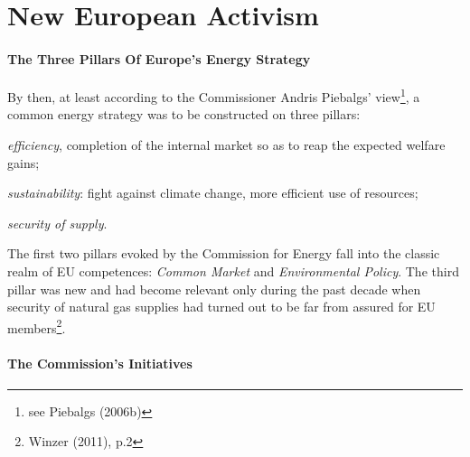 \documentclass[11pt,a4paper,english]{scrreprt}
\begin{document}
  \section{New European Activism}


	\paragraph{The Three Pillars Of Europe's Energy Strategy}

By then, at least according to the Commissioner Andris Piebalgs'
view\footnote{see Piebalgs (2006b)}, a common energy strategy was to be
constructed on three pillars: 
  \begin{inparaenum}[(1)] \item \emph{efficiency}, completion of the internal
market so as to reap the expected welfare gains; \item \emph{sustainability}:
fight against climate change, more efficient use of resources; \item
\emph{security of supply}. \end{inparaenum} 
The first two pillars evoked by the Commission for Energy fall into the classic
realm of EU competences: \emph{Common Market} and \emph{Environmental Policy}.
The third pillar was new and had become relevant only during the past decade
when security of natural gas supplies had turned out to be far from assured for
EU members\footnote{Winzer (2011), p.2}.\par


      \paragraph{The Commission's Initiatives}
\end{document}
